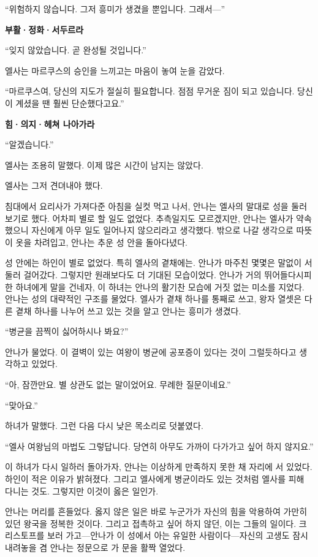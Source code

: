 ``위험하지 않습니다. 그저 흥미가 생겼을 뿐입니다. 그래서—''

\textbf{부활·정화·서두르라}

``잊지 않았습니다. 곧 완성될 것입니다.''

엘사는 마르쿠스의 승인을 느끼고는 마음이 놓여 눈을 감았다.

``마르쿠스여, 당신의 지도가 절실히 필요합니다. 점점 무거운 짐이 되고 있습니다. 당신이 계셨을 땐 훨씬 단순했다고요.''

\textbf{힘·의지·헤쳐 나아가라}

``알겠습니다.''

엘사는 조용히 말했다. 이제 많은 시간이 남지는 않았다.

엘사는 그저 견뎌내야 했다.

\textbreak

침대에서 요리사가 가져다준 아침을 실컷 먹고 나서, 안나는 엘사의 말대로 성을 둘러보기로 했다. 어차피 별로 할 일도 없었다. 추측일지도 모르겠지만, 안나는 엘사가 약속했으니 자신에게 아무 일도 일어나지 않으리라고 생각했다. 밖으로 나갈 생각으로 따뜻이 옷을 차려입고, 안나는 추운 성 안을 돌아다녔다.

성 안에는 하인이 별로 없었다. 특히 엘사의 곁채에는. 안나가 마주친 몇몇은 말없이 서둘러 걸어갔다. 그렇지만 원래보다도 더 기대된 모습이었다. 안나가 거의 뛰어들다시피 한 하녀에게 말을 건네자, 이 하녀는 안나의 활기찬 모습에 거짓 없는 미소를 지었다. 안나는 성의 대략적인 구조를 물었다. 엘사가 곁채 하나를 통째로 쓰고, 왕자 열셋은 다른 곁채 하나를 나누어 쓰고 있는 것을 알고 안나는 흥미가 생겼다.

``병균을 끔찍이 싫어하시나 봐요?''

안나가 물었다. 이 결벽이 있는 여왕이 병균에 공포증이 있다는 것이 그럴듯하다고 생각하고 있었다.

``아, 잠깐만요. 별 상관도 없는 말이었어요. 무례한 질문이네요.''

``맞아요.''

하녀가 말했다. 그런 다음 다시 낮은 목소리로 덧붙였다.

``엘사 여왕님의 마법도 그렇답니다. 당연히 아무도 가까이 다가가고 싶어 하지 않지요.''

이 하녀가 다시 일하러 돌아가자, 안나는 이상하게 만족하지 못한 채 자리에 서 있었다. 하인이 적은 이유가 밝혀졌다. 그리고 엘사에게 병균이라도 있는 것처럼 엘사를 피해 다니는 것도. 그렇지만 이것이 옳은 일인가.

안나는 머리를 흔들었다. 옳지 않은 일은 바로 누군가가 자신의 힘을 악용하여 가만히 있던 왕국을 정복한 것이다. 그리고 접촉하고 싶어 하지 않던, 이는 그들의 일이다. 크리스토프를 보러 가고—안나가 이 성에서 아는 유일한 사람이다—자신의 고생도 잠시 내려놓을 겸 안나는 정문으로 가 문을 활짝 열었다.

